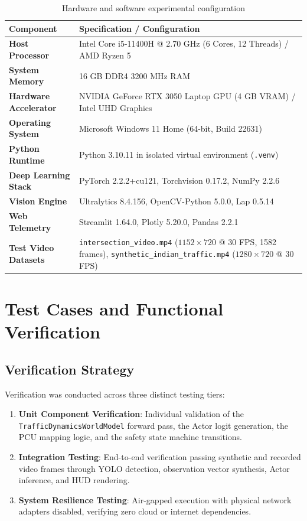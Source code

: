 \documentclass[12pt,a4paper,oneside]{report}
\begin{document}
\begin{table}[htbp]
\centering
\small
\caption{Hardware and software experimental configuration}
\label{tab:ch4_hardware_setup}
\begin{tabularx}{\textwidth}{|p{4.2cm}|X|}
\hline
\textbf{Component} & \textbf{Specification / Configuration} \\ \hline
\textbf{Host Processor} & Intel Core i5-11400H @ 2.70 GHz (6 Cores, 12 Threads) / AMD Ryzen 5 \\ \hline
\textbf{System Memory} & 16 GB DDR4 3200 MHz RAM \\ \hline
\textbf{Hardware Accelerator} & NVIDIA GeForce RTX 3050 Laptop GPU (4 GB VRAM) / Intel UHD Graphics \\ \hline
\textbf{Operating System} & Microsoft Windows 11 Home (64-bit, Build 22631) \\ \hline
\textbf{Python Runtime} & Python 3.10.11 in isolated virtual environment (\texttt{.venv}) \\ \hline
\textbf{Deep Learning Stack} & PyTorch 2.2.2+cu121, Torchvision 0.17.2, NumPy 2.2.6 \\ \hline
\textbf{Vision Engine} & Ultralytics 8.4.156, OpenCV-Python 5.0.0, Lap 0.5.14 \\ \hline
\textbf{Web Telemetry} & Streamlit 1.64.0, Plotly 5.20.0, Pandas 2.2.1 \\ \hline
\textbf{Test Video Datasets} & \texttt{intersection\_video.mp4} ($1152 \times 720$ @ 30 FPS, 1582 frames), \texttt{synthetic\_indian\_traffic.mp4} ($1280 \times 720$ @ 30 FPS) \\ \hline
\end{tabularx}
\end{table}

\section{Test Cases and Functional Verification}
\label{sec:ch4_test_cases}

\subsection{Verification Strategy}
Verification was conducted across three distinct testing tiers:
\begin{enumerate}
    \item \textbf{Unit Component Verification}: Individual validation of the \texttt{TrafficDynamicsWorldModel} forward pass, the Actor logit generation, the PCU mapping logic, and the safety state machine transitions.
    \item \textbf{Integration Testing}: End-to-end verification passing synthetic and recorded video frames through YOLO detection, observation vector synthesis, Actor inference, and HUD rendering.
    \item \textbf{System Resilience Testing}: Air-gapped execution with physical network adapters disabled, verifying zero cloud or internet dependencies.
\end{enumerate}
\end{document}

